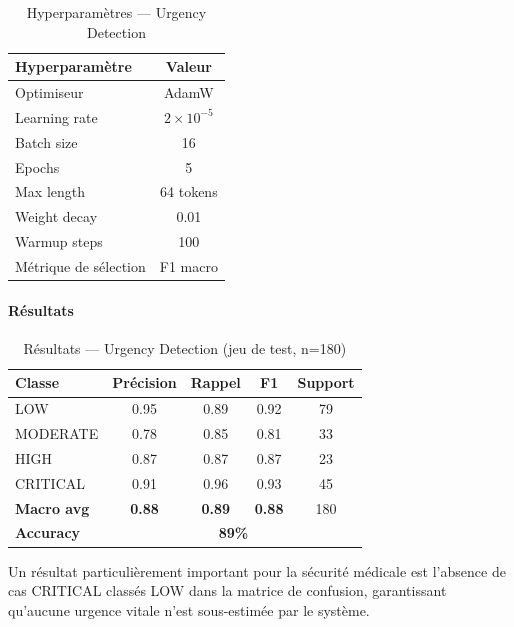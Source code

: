 \begin{table}[H]
\centering
\caption{Hyperparamètres — Urgency Detection}
\label{tab:urgency-hp}
\renewcommand{\arraystretch}{1.4}
\begin{tabular}{|l|c|}
\hline
\textbf{Hyperparamètre} & \textbf{Valeur} \\
\hline
Optimiseur            & AdamW \\
Learning rate         & $2 \times 10^{-5}$ \\
Batch size            & 16 \\
Epochs                & 5 \\
Max length            & 64 tokens \\
Weight decay          & 0.01 \\
Warmup steps          & 100 \\
Métrique de sélection & F1 macro \\
\hline
\end{tabular}
\end{table}

\paragraph{Résultats}

\begin{table}[H]
\centering
\caption{Résultats — Urgency Detection (jeu de test, n=180)}
\label{tab:urgency-results}
\renewcommand{\arraystretch}{1.4}
\begin{tabular}{|l|c|c|c|c|}
\hline
\textbf{Classe} & \textbf{Précision} & \textbf{Rappel} &
\textbf{F1} & \textbf{Support} \\
\hline
LOW      & 0.95 & 0.89 & 0.92 & 79 \\
MODERATE & 0.78 & 0.85 & 0.81 & 33 \\
HIGH     & 0.87 & 0.87 & 0.87 & 23 \\
CRITICAL & 0.91 & 0.96 & 0.93 & 45 \\
\hline
\textbf{Macro avg} & \textbf{0.88} & \textbf{0.89} &
\textbf{0.88} & 180 \\
\hline
\textbf{Accuracy} & \multicolumn{4}{c|}{\textbf{89\%}} \\
\hline
\end{tabular}
\end{table}

Un résultat particulièrement important pour la sécurité médicale est l'absence de cas CRITICAL classés LOW dans la matrice de confusion, garantissant qu'aucune urgence vitale n'est sous-estimée par le système.

